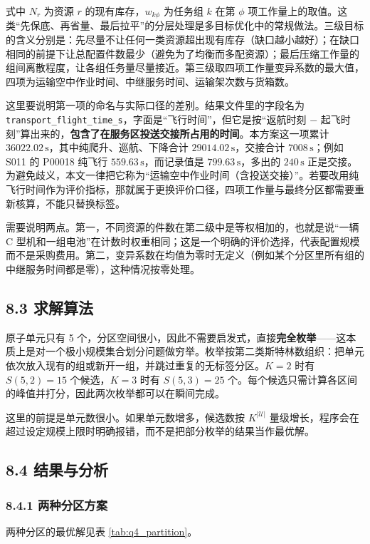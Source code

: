\documentclass[withoutpreface,bwprint]{format}
\begin{document}
式中 $N_r$ 为资源 $r$ 的现有库存，$w_{k\phi}$ 为任务组 $k$ 在第 $\phi$ 项工作量上的取值。这类“先保底、再省量、最后拉平”的分层处理是多目标优化中的常规做法\cite{ehrgott2005}。三级目标的含义分别是：先尽量不让任何一类资源超出现有库存（缺口越小越好）；在缺口相同的前提下让总配置件数最少（避免为了均衡而多配资源）；最后压缩工作量的组间离散程度，让各组任务量尽量接近。第三级取四项工作量变异系数的最大值，四项为运输空中作业时间、中继服务时间、运输架次数与货箱数。

这里要说明第一项的命名与实际口径的差别。结果文件里的字段名为 \texttt{transport\_\allowbreak flight\_\allowbreak time\_s}，字面是“飞行时间”，但它是按“返航时刻 $-$ 起飞时刻”算出来的，\textbf{包含了在服务区投送交接所占用的时间}。本方案这一项累计 $36022.02\,\text{s}$，其中纯爬升、巡航、下降合计 $29014.02\,\text{s}$，交接合计 $7008\,\text{s}$；例如 S011 的 P00018 纯飞行 $559.63\,\text{s}$，而记录值是 $799.63\,\text{s}$，多出的 $240\,\text{s}$ 正是交接。为避免歧义，本文一律把它称为“运输空中作业时间（含投送交接）”。若要改用纯飞行时间作为评价指标，那就属于更换评价口径，四项工作量与最终分区都需要重新核算，不能只替换标签。

需要说明两点。第一，不同资源的件数在第二级中是等权相加的，也就是说“一辆 C 型机和一组电池”在计数时权重相同；这是一个明确的评价选择，代表配置规模而不是采购费用。第二，变异系数在均值为零时无定义（例如某个分区里所有组的中继服务时间都是零），这种情况按零处理。

\subsection{8.3 求解算法}

原子单元只有 5 个，分区空间很小，因此不需要启发式，直接\textbf{完全枚举}——这本质上是对一个极小规模集合划分问题做穷举\cite{balas1976}。枚举按第二类斯特林数组织：把单元依次放入现有的组或新开一组，并跳过重复的无标签分区。$K=2$ 时有 $S(5,2) = 15$ 个候选，$K=3$ 时有 $S(5,3) = 25$ 个。每个候选只需计算各区间的峰值并打分，因此两次枚举都可以在瞬间完成。

这里的前提是单元数很小。如果单元数增多，候选数按 $K^{|\mathcal{U}|}$ 量级增长，程序会在超过设定规模上限时明确报错，而不是把部分枚举的结果当作最优解。

\subsection{8.4 结果与分析}

\subsubsection{8.4.1 两种分区方案}
两种分区的最优解见表 \ref{tab:q4_partition}。
\end{document}
